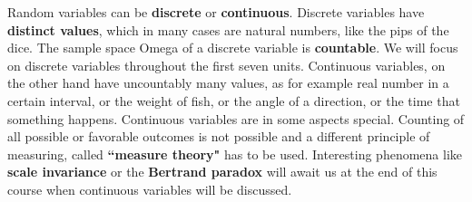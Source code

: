 \documentclass[12pt, a4paper]{scrartcl}
\begin{document}
Random variables can be \textbf{discrete} or \textbf{continuous}. 
Discrete variables have \textbf{distinct values}, which in many cases are natural numbers, like the pips of the dice. The sample space Omega of a discrete variable is \textbf{countable}. We will focus on discrete variables throughout the first seven units.
Continuous variables, on the other hand have uncountably many values, as for example real number in a certain interval, or the weight of fish, or the angle of a direction, or the time that something happens.
Continuous variables are in some aspects special. Counting of all possible or favorable outcomes is not possible and a different principle of measuring, called \textbf{``measure theory"} has to be used. Interesting phenomena like \textbf{scale invariance} or the \textbf{Bertrand paradox} will await us at the end of this course when continuous variables will be discussed.\\
\end{document}
